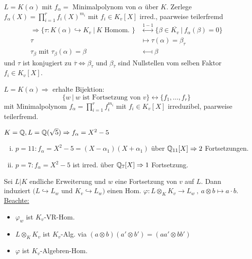 
\begin{Bem}
$L=K(\alpha)$ mit $f_\alpha=$ Minimalpolynom von $\alpha$ über $K$. Zerlege $f_\alpha(X)=\prod_{i=1}^r f_i(X)^{m_i}$ mit $f_i \in K_v[X]$ irred., paarweise teilerfremd
\begin{align*}
\Rightarrow \{\tau: K(\alpha) \hookrightarrow K_v \ | \ K \text{ Homom. }\} &\stackrel{1-1}{\longleftrightarrow} \{\beta \in \overline{K_v} \ | \ f_\alpha(\beta)=0\}\\
\tau & \longmapsto \tau(\alpha) = \beta_\tau\\
\tau_\beta \text{ mit } \tau_\beta(\alpha)=\beta &\longmapsfrom \beta
\end{align*}
und $\tau$ ist konjugiert zu $\overline{\tau} \iff \beta_\tau$ und $\beta_{\overline{\tau}}$ sind Nullstellen vom selben Faktor $f_i \in K_v[X]$.
\end{Bem}

\begin{Kor}
$L=K(\alpha) \Rightarrow$ erhalte Bijektion:
\[ \{w \ | \ w \text{ ist Fortsetzung von } v\} \leftrightarrow \{f_1, \dots, f_r\}\]
mit Minimalpolynom $f_\alpha = \prod_{i=1}^r f_i^{m_i}$ mit $f_i \in K_v[X]$ irreduzibel, paarweise teilerfremd.
\end{Kor}

\begin{Bsp}
$K=\mathbb{Q}, L=\mathbb{Q}(\sqrt{5}) \Rightarrow f_\alpha=X^2-5$
\begin{enumerate}[i)]
\item $p=11: f_\alpha = X^2-5=(X-\alpha_1)(X+\alpha_1)$ über $\mathbb{Q}_{11}[X] \Rightarrow 2 $ Fortsetzungen.
\item $p=7: f_\alpha=X^2-5$ ist irred. über $\mathbb{Q}_7[X] \Rightarrow 1 $ Fortsetzung.
\end{enumerate}
\end{Bsp}

\begin{Bem}
Sei $L|K$ endliche Erweiterung und $w$ eine Fortsetzung von $v$ auf $L$. Dann induziert $(L \hookrightarrow L_w$ und $K_v \hookrightarrow L_w)$ einen Hom. $\varphi : L \otimes_K K_v \to L_w \ , \ a \otimes b \mapsto a \cdot b$.\\
\underline{Beachte:}
\begin{itemize}
\item $\varphi_w$ ist $K_v$-VR-Hom.
\item $L \otimes_K K_v$ ist $K_v$-Alg. via $(a \otimes b)(a' \otimes b')=(aa' \otimes bb')$
\item $\varphi$ ist $K_v$-Algebren-Hom.
\end{itemize}
\end{Bem}

